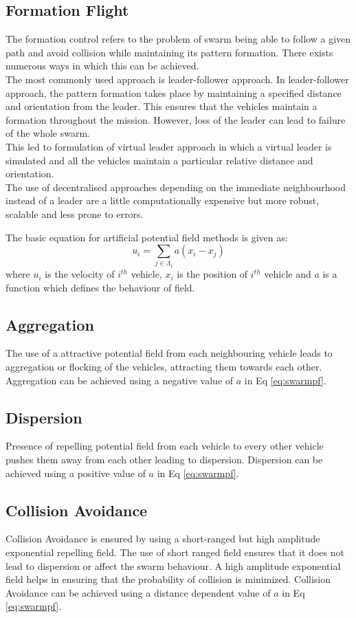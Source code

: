 \begin{spacing}{2}
\subsection{Formation Flight}
The formation control refers to the problem of swarm being able to follow a given path and avoid collision while maintaining its pattern formation. There exists numerous ways in which this can be achieved. \\The most commonly used approach is leader-follower approach. In leader-follower approach, the pattern formation takes place by maintaining a specified distance and orientation from the leader. This ensures that the vehicles maintain a formation throughout the mission. However, loss of the leader can lead to failure of the whole swarm.\\ This led to formulation of virtual leader approach in which a virtual leader is simulated and all the vehicles maintain a particular relative distance and orientation. 
\\ The use of decentralised approaches depending on the immediate neighbourhood instead of a leader are a little computationally expensive but more robust, scalable and less prone to errors.

The basic equation for artificial potential field methods is given as:
\begin{equation}
    u_i = \sum_{j \in \Lambda_i} a (x_i - x_j)
    \label{eq:swarmpf}
\end{equation}
where $u_i$ is the velocity of $i^{th}$ vehicle, $x_i$ is the position of $i^{th}$ vehicle and $a$ is a function which defines the behaviour of field. 

\subsection{Aggregation}
The use of a attractive potential field from each neighbouring vehicle leads to aggregation or flocking of the vehicles, attracting them towards each other. Aggregation can be achieved using a negative value of $a$ in Eq \ref{eq:swarmpf}.

\subsection{Dispersion}
Presence of repelling potential field from each vehicle to every other vehicle pushes them away from each other leading to dispersion. Dispersion can be achieved using a positive value of $a$ in Eq \ref{eq:swarmpf}.

\subsection{Collision Avoidance}
Collision Avoidance is ensured by using a short-ranged but high amplitude exponential repelling field. The use of short ranged field ensures that it does not lead to dispersion or affect the swarm behaviour. A high amplitude exponential field helps in ensuring that the probability of collision is minimized.
Collision Avoidance can be achieved using a distance dependent value of $a$ in Eq \ref{eq:swarmpf}.

\end{spacing}